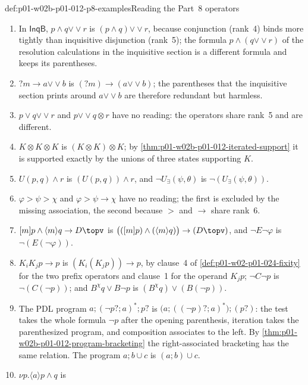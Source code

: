 \begin{hbexample}{def:p01-w02b-p01-012-p8-examples}{Reading the Part~8 operators}
\begin{enumerate}
\item In \(\mathsf{InqB}\), \(p\land q\mathbin{\vee\!\vee}r\) is
  \((p\land q)\mathbin{\vee\!\vee}r\), because conjunction (rank~4) binds
  more tightly than inquisitive disjunction (rank~5); the formula
  \(p\land(q\mathbin{\vee\!\vee}r)\) of the resolution calculations in the
  inquisitive section is a different formula and keeps its parentheses.
\item \(?m\to a\mathbin{\vee\!\vee}b\) is
  \((?m)\to(a\mathbin{\vee\!\vee}b)\); the parentheses that the
  inquisitive section prints around \(a\mathbin{\vee\!\vee}b\) are
  therefore redundant but harmless.
\item \(p\lor q\mathbin{\vee\!\vee}r\) and
  \(p\mathbin{\vee\!\vee}q\otimes r\) have no reading: the operators share
  rank~5 and are different.
\item \(K\otimes K\otimes K\) is \((K\otimes K)\otimes K\); by
  \cref{thm:p01-w02b-p01-012-iterated-support} it is supported exactly by
  the unions of three states supporting \(K\).
\item \(U(p,q)\land r\) is \((U(p,q))\land r\), and
  \(\neg U_{\exists}(\psi,\theta)\) is \(\neg(U_{\exists}(\psi,\theta))\).
\item \(\varphi>\psi>\chi\) and \(\varphi>\psi\to\chi\) have no reading;
  the first is excluded by the missing association, the second because
  \(>\) and \(\to\) share rank~6.
\item \([m]p\land\langle m\rangle q\to D\topv\) is
  \(\bigl(([m]p)\land(\langle m\rangle q)\bigr)\to(D\topv)\), and
  \(\neg E\neg\varphi\) is \(\neg(E(\neg\varphi))\).
\item \(K_iK_jp\to p\) is \((K_i(K_jp))\to p\), by clause~4 of
  \cref{def:p01-w02-p01-024-fixity} for the two prefix operators and
  clause~1 for the operand \(K_jp\); \(\neg C\neg p\) is
  \(\neg(C(\neg p))\); and \(B^\chi q\lor B\neg p\) is
  \((B^\chi q)\lor(B(\neg p))\).
\item The PDL program \(a;(\neg p?;a)^*;p?\) is
  \(\bigl(a;((\neg p)?;a)^*\bigr);(p?)\): the test takes the whole
  formula \(\neg p\) after the opening parenthesis, iteration takes the
  parenthesized program, and composition associates to the left.  By
  \cref{thm:p01-w02b-p01-012-program-bracketing} the right-associated
  bracketing has the same relation.  The program \(a;b\cup c\) is
  \((a;b)\cup c\).
\item \(\nu p.\langle a\rangle p\land q\) is

\end{enumerate}
\end{hbexample}
